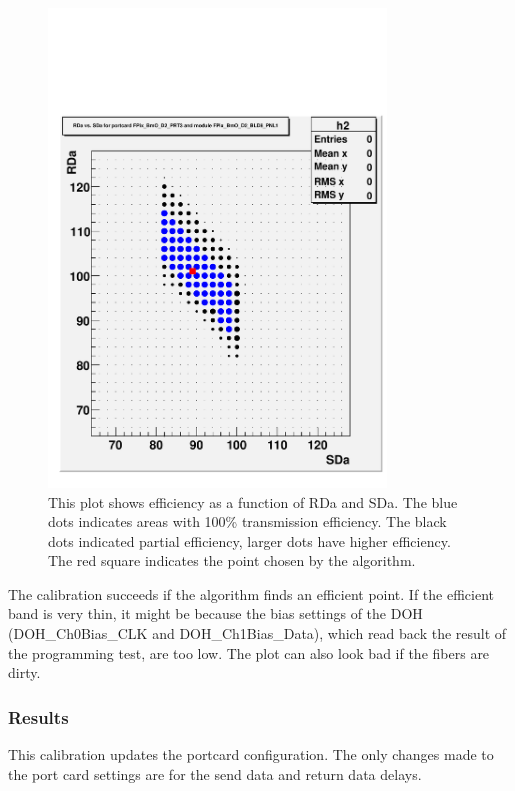 \begin{figure}
\begin{center}
 \includegraphics[width=0.8\textwidth]{graph_FPix_BmO_D2_PRT3_FPix_BmO_D2_BLD8_PNL1.pdf}
\end{center}
\caption{
This plot shows efficiency as a function of RDa and SDa. The blue dots indicates areas with 100\% transmission efficiency. The black dots indicated partial efficiency, larger dots have higher efficiency. The red square indicates the point chosen by the algorithm. }
\label{fig:Delay25Scan}
\end{figure}

The calibration succeeds if the algorithm finds an efficient point.  If the efficient band is very thin, it might be because the bias settings of the DOH (DOH\_Ch0Bias\_CLK and DOH\_Ch1Bias\_Data), which read back the result of the programming test, are too low.  The plot can also look bad if the fibers are dirty.

\subsubsection{Results}
This calibration updates the portcard configuration.  The only changes made to the port card settings are for the send data and return data delays.

